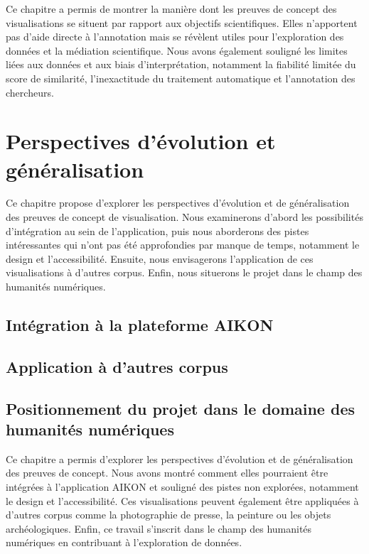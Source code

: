 \documentclass[a4paper,12pt,twoside]{book}
\newcommand{\clearemptydoublepage}{\newpage{\pagestyle{empty}\cleardoublepage}}
\begin{document}
	
	Ce chapitre a permis de montrer la manière dont les preuves de concept des visualisations se situent par rapport aux objectifs scientifiques. Elles n'apportent pas d'aide directe à l'annotation mais se révèlent utiles pour l'exploration des données et la médiation scientifique. Nous avons également souligné les limites liées aux données et aux biais d'interprétation, notamment la fiabilité limitée du score de similarité, l'inexactitude du traitement automatique et l'annotation des chercheurs.
	
	\clearemptydoublepage
	
	\chapter{Perspectives d'évolution et généralisation}
	
	Ce chapitre propose d'explorer les perspectives d'évolution et de généralisation des preuves de concept de visualisation. Nous examinerons d'abord les possibilités d'intégration au sein de l'application, puis nous aborderons des pistes intéressantes qui n'ont pas été approfondies par manque de temps, notamment le design et l'accessibilité. Ensuite, nous envisagerons l'application de ces visualisations à d'autres corpus. Enfin, nous situerons le projet dans le champ des humanités numériques.
	
	\section{Intégration à la plateforme AIKON}
	
	
	\section{Application à d'autres corpus}
	
	
	\section[Positionnement dans les humanités numériques]{Positionnement du projet dans le domaine des humanités numériques}
	
	
	Ce chapitre a permis d'explorer les perspectives d'évolution et de généralisation des preuves de concept. Nous avons montré comment elles pourraient être intégrées à l'application AIKON et souligné des pistes non explorées, notamment le design et l'accessibilité. Ces visualisations peuvent également être appliquées à d'autres corpus comme la photographie de presse, la peinture ou les objets archéologiques. Enfin, ce travail s'inscrit dans le champ des humanités numériques en contribuant à l'exploration de données.
	
\end{document}
